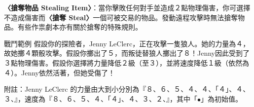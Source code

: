 \textbf{〈搶奪物品 Stealing Item〉}：當你擊敗任何對手並造成２點物理傷害，你可選擇不造成傷害而\textbf{〈搶奪 Steal〉}一個可被交易的物品。發動遠程攻擊時無法搶奪物品。有些作祟劇本亦有關於搶奪的特殊規則。

\begin{RuleBox}{戰鬥範例}
	假設你的探險者，Jenny LeClerc，正在攻擊一隻狼人。她的力量為４，故她擲４顆骰攻擊。假設你擲出了５，而叛徒替狼人擲出了８！Jenny因此受到了３點物理傷害。假設你選擇將力量降低２級（至３），並將速度降低１級（依然為４）。Jenny依然活著，但她受傷了！

	附註：Jenny LeClerc 的力量由大到小分別為『８、６、５、４、４、\textcolor{green!50!black}{「４」}、４、３、\SkullSymbol{}』，速度為『８、６、５、４、\textcolor{green!50!black}{「４」}、４、３、２、\SkullSymbol{}』，其中「$\bullet$」為初始值。
\end{RuleBox}
